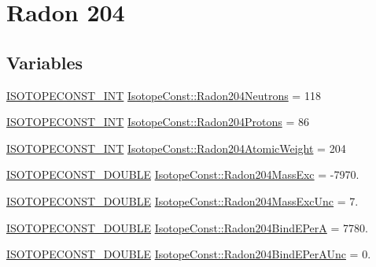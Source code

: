 \hypertarget{group___isotope_const-_radon-_rn204}{}\section{Radon 204}
\label{group___isotope_const-_radon-_rn204}
\subsection*{Variables}
\begin{DoxyCompactItemize}
\item 
\mbox{\hyperlink{group___isotope_const-_macros_ga5f18360b3e99483a35c32d789e62621c}{I\+S\+O\+T\+O\+P\+E\+C\+O\+N\+S\+T\+\_\+\+I\+NT}} \mbox{\hyperlink{group___isotope_const-_radon-_rn204_ga008dd1eaae595deade3e1120d99831ee}{Isotope\+Const\+::\+Radon204\+Neutrons}} = 118
\item 
\mbox{\hyperlink{group___isotope_const-_macros_ga5f18360b3e99483a35c32d789e62621c}{I\+S\+O\+T\+O\+P\+E\+C\+O\+N\+S\+T\+\_\+\+I\+NT}} \mbox{\hyperlink{group___isotope_const-_radon-_rn204_ga90d1408384f7129e55c6bd6be9f9eff1}{Isotope\+Const\+::\+Radon204\+Protons}} = 86
\item 
\mbox{\hyperlink{group___isotope_const-_macros_ga5f18360b3e99483a35c32d789e62621c}{I\+S\+O\+T\+O\+P\+E\+C\+O\+N\+S\+T\+\_\+\+I\+NT}} \mbox{\hyperlink{group___isotope_const-_radon-_rn204_ga8cd66d932f9e68f933db38a4fed1c17b}{Isotope\+Const\+::\+Radon204\+Atomic\+Weight}} = 204
\item 
\mbox{\hyperlink{group___isotope_const-_macros_ga8f45a7272ce02c0b4c65c44636ed719a}{I\+S\+O\+T\+O\+P\+E\+C\+O\+N\+S\+T\+\_\+\+D\+O\+U\+B\+LE}} \mbox{\hyperlink{group___isotope_const-_radon-_rn204_ga0e55ac5c0826da2580e66443e1c03ce4}{Isotope\+Const\+::\+Radon204\+Mass\+Exc}} = -\/7970.
\item 
\mbox{\hyperlink{group___isotope_const-_macros_ga8f45a7272ce02c0b4c65c44636ed719a}{I\+S\+O\+T\+O\+P\+E\+C\+O\+N\+S\+T\+\_\+\+D\+O\+U\+B\+LE}} \mbox{\hyperlink{group___isotope_const-_radon-_rn204_ga23c4941f0386c3086e00530fcff85d16}{Isotope\+Const\+::\+Radon204\+Mass\+Exc\+Unc}} = 7.
\item 
\mbox{\hyperlink{group___isotope_const-_macros_ga8f45a7272ce02c0b4c65c44636ed719a}{I\+S\+O\+T\+O\+P\+E\+C\+O\+N\+S\+T\+\_\+\+D\+O\+U\+B\+LE}} \mbox{\hyperlink{group___isotope_const-_radon-_rn204_ga0fdd4e4a68af116268607e9c98816771}{Isotope\+Const\+::\+Radon204\+Bind\+E\+PerA}} = 7780.
\item 
\mbox{\hyperlink{group___isotope_const-_macros_ga8f45a7272ce02c0b4c65c44636ed719a}{I\+S\+O\+T\+O\+P\+E\+C\+O\+N\+S\+T\+\_\+\+D\+O\+U\+B\+LE}} \mbox{\hyperlink{group___isotope_const-_radon-_rn204_gada2f4fb38201ebe48b01a2e0fba9c9a2}{Isotope\+Const\+::\+Radon204\+Bind\+E\+Per\+A\+Unc}} = 0.

\end{DoxyCompactItemize}

